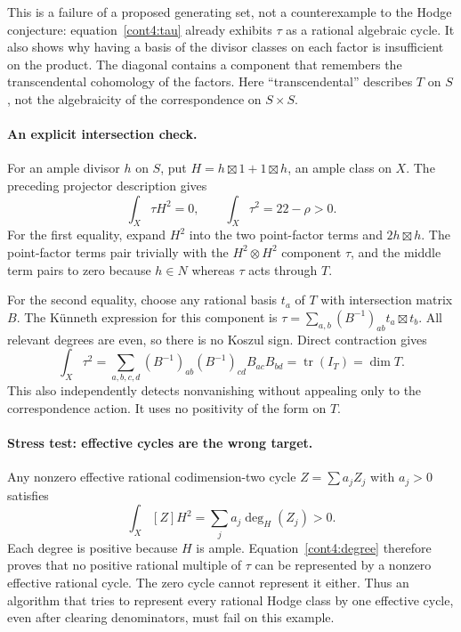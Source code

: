 \documentclass[11pt]{article}
\begin{document}
This is a failure of a proposed generating set, not a counterexample to
the Hodge conjecture: equation~\eqref{cont4:tau} already exhibits $\tau$
as a rational algebraic cycle. It also shows why having a basis of the
divisor classes on each factor is insufficient on the product. The
diagonal contains a component that remembers the transcendental
cohomology of the factors. Here ``transcendental'' describes $T$ on $S$,
not the algebraicity of the correspondence on $S\times S$.

\paragraph{An explicit intersection check.}
For an ample divisor $h$ on $S$, put
$H=h\boxtimes1+1\boxtimes h$, an ample class on $X$. The preceding
projector description gives
\begin{equation}\label{cont4:degree}
 \int_X\tau H^2=0,\qquad
 \int_X\tau^2=22-\rho>0.
\end{equation}
For the first equality, expand $H^2$ into the two point-factor terms and
$2h\boxtimes h$. The point-factor terms pair trivially with the
$H^2\otimes H^2$ component $\tau$, and the middle term pairs to zero
because $h\in N$ whereas $\tau$ acts through $T$.

For the second equality, choose any rational basis $t_a$ of $T$ with
intersection matrix $B$. The K\"unneth expression for this component is
$\tau=\sum_{a,b}(B^{-1})_{ab}t_a\boxtimes t_b$. All relevant degrees
are even, so there is no Koszul sign. Direct contraction gives
\[
 \int_X\tau^2
 =\sum_{a,b,c,d}(B^{-1})_{ab}(B^{-1})_{cd}B_{ac}B_{bd}
 =\operatorname{tr}(I_T)=\dim T.
\]
This also independently detects nonvanishing without appealing only to
the correspondence action. It uses no positivity of the form on $T$.

\paragraph{Stress test: effective cycles are the wrong target.}
Any nonzero effective rational codimension-two cycle
$Z=\sum a_jZ_j$ with $a_j>0$ satisfies
\[
 \int_X[Z]H^2=\sum_j a_j\deg_H(Z_j)>0.
\]
Each degree is positive because $H$ is ample. Equation~\eqref{cont4:degree}
therefore proves that no positive rational multiple of $\tau$ can be
represented by a nonzero effective rational cycle. The zero cycle cannot
represent it either. Thus an algorithm that tries to represent every
rational Hodge class by one effective cycle, even after clearing
denominators, must fail on this example.
\end{document}
